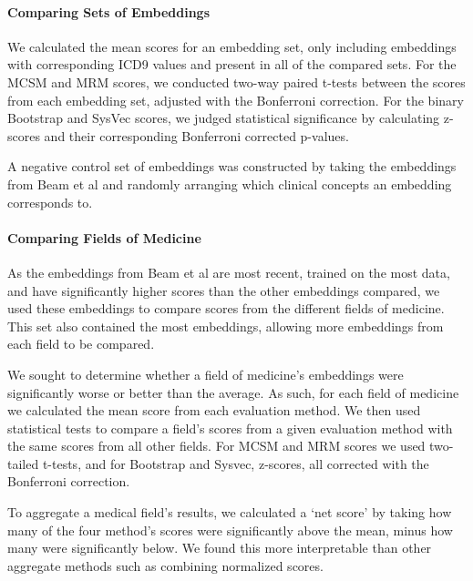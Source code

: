 \documentclass[11pt,a4paper]{article}
\begin{document}
\paragraph{Comparing Sets of Embeddings}We calculated the mean scores for an embedding set, only including embeddings with corresponding ICD9 values and present in all of the compared sets. For the MCSM and MRM scores, we conducted two-way paired t-tests between the scores from each embedding set, adjusted with the Bonferroni correction. For the binary Bootstrap and SysVec scores, we judged statistical significance by calculating z-scores and their corresponding Bonferroni corrected p-values. 

A negative control set of embeddings was constructed by taking the embeddings from Beam et al  and randomly arranging which clinical concepts an embedding corresponds to. 

\paragraph{Comparing Fields of Medicine} As the embeddings from Beam et al  are most recent, trained on the most data, and have significantly higher scores than the other embeddings compared, we used these embeddings to compare scores from the different fields of medicine. This set also contained the most embeddings, allowing more embeddings from each field to be compared. 

We sought to determine whether a field of medicine's embeddings were significantly worse or better than the average. As such, for each field of medicine we calculated the mean score from each evaluation method. We then used statistical tests to compare a field's scores from a given evaluation method with the same scores from all other fields. For MCSM and MRM scores we used two-tailed t-tests, and for Bootstrap and Sysvec, z-scores, all corrected with the Bonferroni correction. 

To aggregate a medical field's results, we calculated a `net score' by taking how many of the four method's scores were significantly above the mean, minus how many were significantly below. We found this more interpretable than other aggregate methods such as combining normalized scores. 
\end{document}
